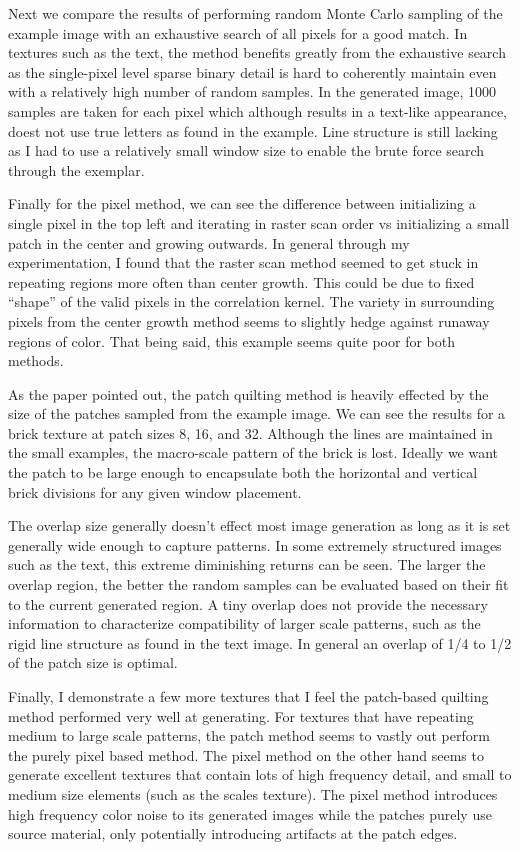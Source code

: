 \documentclass[a4paper, 11pt, titlepage]{article}
\begin{document}
Next we compare the results of performing random Monte Carlo sampling of the
example image with an exhaustive search of all pixels for a good match. In
textures such as the text, the method benefits greatly from the exhaustive
search as the single-pixel level sparse binary detail is hard to coherently
maintain even with a relatively high number of random samples. In the generated
image, 1000 samples are taken for each pixel which although results in a
text-like appearance, doest not use true letters as found in the example. Line
structure is still lacking as I had to use a relatively small window size to
enable the brute force search through the exemplar.

Finally for the pixel method, we can see the difference between initializing a
single pixel in the top left and iterating in raster scan order vs initializing a
small patch in the center and growing outwards. In general through my
experimentation, I found that the raster scan method seemed to get stuck in
repeating regions more often than center growth. This could be due to fixed
``shape'' of the valid pixels in the correlation kernel. The variety in
surrounding pixels from the center growth method seems to slightly hedge against
runaway regions of color. That being said, this example seems quite poor for
both methods.

As the paper pointed out, the patch quilting method is heavily effected by the
size of the patches sampled from the example image. We can see the results for a
brick texture at patch sizes 8, 16, and 32. Although the lines are maintained in
the small examples, the macro-scale pattern of the brick is lost. Ideally we
want the patch to be large enough to encapsulate both the horizontal and
vertical brick divisions for any given window placement.

The overlap size generally doesn't effect most image generation as long as it is
set generally wide enough to capture patterns. In some extremely structured
images such as the text, this extreme diminishing returns can be seen. The
larger the overlap region, the better the random samples can be evaluated based
on their fit to the current generated region. A tiny overlap does not provide
the necessary information to characterize compatibility of larger scale
patterns, such as the rigid line structure as found in the text image. In
general an overlap of 1/4 to 1/2 of the patch size is optimal.

Finally, I demonstrate a few more textures that I feel the patch-based quilting
method performed very well at generating. For textures that have repeating medium to large
scale patterns, the patch method seems to vastly out perform the purely pixel
based method. The pixel method on the other hand seems to generate excellent
textures that contain lots of high frequency detail, and small to medium size
elements (such as the scales texture). The pixel method introduces high
frequency color noise to its generated images while the patches purely use
source material, only potentially introducing artifacts at the patch edges. 
\end{document}
